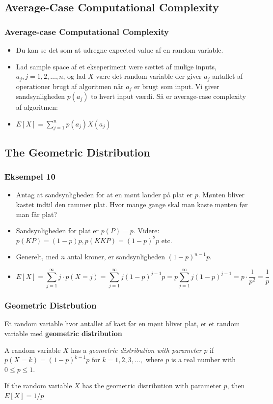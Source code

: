 \documentclass{beamer}
\begin{document}
\subsection{Average-Case Computational Complexity}
\label{subsec:average}

\begin{frame}
  \frametitle{Average-case Computational Complexity}
  \begin{itemize}
  \item Du kan se det som at udregne expected value af en random variable. 
  \item Lad sample space af et ekseperiment være sættet af mulige inputs, $a_{j}, j = 1, 2, \ldots, n$, og lad $X$ være det random variable der giver $a_{j}$ antallet af operationer brugt af algoritmen når $a_{j}$ er brugt som input. Vi giver sandsynligheden $p(a_{j})$ to hvert input værdi. Så er average-case complexity af algoritmen:
  \item $E[X] = \sum_{j=1}^{n} p(a_{j}) X(a_{j})$
  \end{itemize} 
\end{frame}


\subsection{The Geometric Distribution}
\label{subsec:geometric-distribution}

\begin{frame}
  \frametitle{Eksempel 10}
  \begin{itemize}
  \item Antag at sandsynligheden for at en mønt lander på plat er $p$. Mønten bliver kastet indtil den rammer plat. Hvor mange gange skal man kaste mønten før man får plat?
  \item Sandsynligheden for plat er $p(P) = p$. Videre: $p(KP) = (1-p)p, p(KKP) = (1-p)^{2}p$ etc.
  \item Generelt, med $n$ antal kroner, er sandsynligheden $(1-p)^{n-1}p$.
  \item \[ E[X] = \sum_{j=1}^{\infty}j\cdot p(X = j) = \sum_{j=1}^{\infty} j(1-p)^{j-1} p = p \sum_{j=1}^{\infty} j(1-p)^{j-1} = p \cdot \frac{1}{p^{2}} = \frac{1}{p} \]
  \end{itemize}
\end{frame}

\begin{frame}
  \frametitle{Geometric Distrbution}

  Et random variable hvor antallet af kast før en mønt bliver plat, er et random variable med \textbf{geometric distribution} 
  \begin{definition}
    A random variable $X$ has a \textit{geometric distribution with parameter } $p$ if $p(X=k)=(1-p)^{k-1}p$ for $k=1,2,3, \ldots,$ where $p$ is a real number with $0 \leq p \leq 1$.
  \end{definition}

  \begin{theorem}[Theorem 4]
    If the random variable $X$ has the geometric distribution with parameter $p$, then $E[X] = 1/p$
  \end{theorem}
\end{frame}
\end{document}
